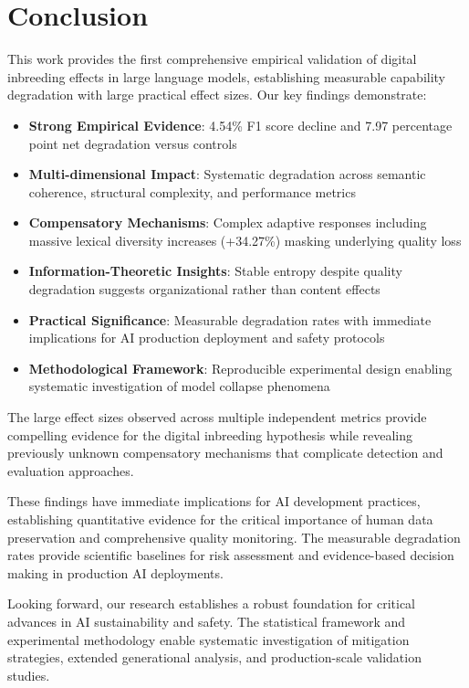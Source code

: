 \documentclass{article}
\begin{document}
\section{Conclusion}

This work provides the first comprehensive empirical validation of digital inbreeding effects in large language models, establishing measurable capability degradation with large practical effect sizes. Our key findings demonstrate:

\begin{itemize}
    \item \textbf{Strong Empirical Evidence}: 4.54\% F1 score decline and 7.97 percentage point net degradation versus controls
    \item \textbf{Multi-dimensional Impact}: Systematic degradation across semantic coherence, structural complexity, and performance metrics
    \item \textbf{Compensatory Mechanisms}: Complex adaptive responses including massive lexical diversity increases (+34.27\%) masking underlying quality loss
    \item \textbf{Information-Theoretic Insights}: Stable entropy despite quality degradation suggests organizational rather than content effects
    \item \textbf{Practical Significance}: Measurable degradation rates with immediate implications for AI production deployment and safety protocols
    \item \textbf{Methodological Framework}: Reproducible experimental design enabling systematic investigation of model collapse phenomena
\end{itemize}

The large effect sizes observed across multiple independent metrics provide compelling evidence for the digital inbreeding hypothesis while revealing previously unknown compensatory mechanisms that complicate detection and evaluation approaches.

These findings have immediate implications for AI development practices, establishing quantitative evidence for the critical importance of human data preservation and comprehensive quality monitoring. The measurable degradation rates provide scientific baselines for risk assessment and evidence-based decision making in production AI deployments.

Looking forward, our research establishes a robust foundation for critical advances in AI sustainability and safety. The statistical framework and experimental methodology enable systematic investigation of mitigation strategies, extended generational analysis, and production-scale validation studies.
\end{document}

